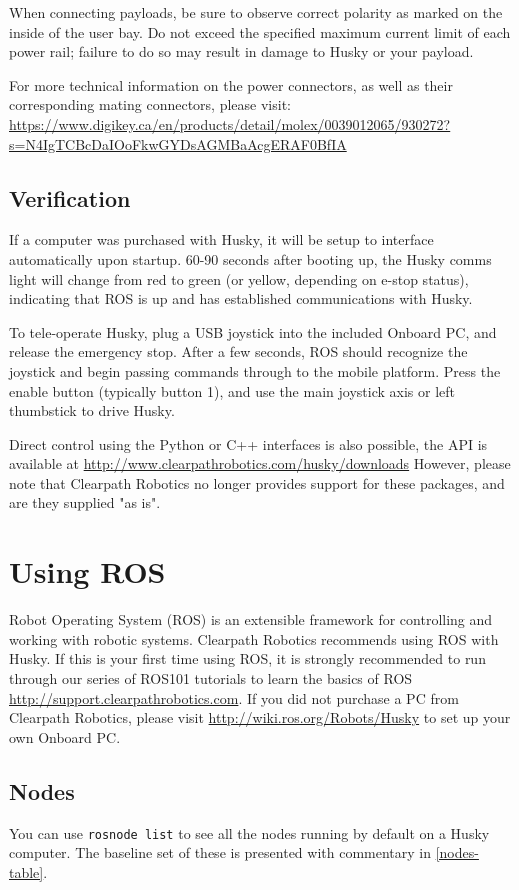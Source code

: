 \documentclass[]{clearpath-latex/clearpath-manual}
\begin{document}
When connecting payloads, be sure to observe correct polarity as marked on the inside of the user bay.
Do not exceed the specified maximum current limit of each power rail; failure to do so may result in damage
to Husky or your payload.

For more technical information on the power connectors, as well as their corresponding mating connectors, please visit: \url{https://www.digikey.ca/en/products/detail/molex/0039012065/930272?s=N4IgTCBcDaIOoFkwGYDsAGMBaAcgERAF0BfIA}

\subsection{Verification}
If a computer was purchased with Husky, it will be setup to interface automatically upon startup.
60-90 seconds after booting up, the Husky comms light will change from red to green
(or yellow, depending on e-stop status), indicating that ROS is up and has established communications with Husky.

To tele-operate Husky, plug a USB joystick into the included Onboard PC, and release the emergency stop.
After a few seconds, ROS should recognize the joystick and begin passing commands through to the mobile platform.
Press the enable button (typically button 1), and use the main joystick axis or left thumbstick to drive Husky.

Direct control using the Python or C++ interfaces is also possible, the API is available at
\url{http://www.clearpathrobotics.com/husky/downloads} However, please note that Clearpath Robotics no
longer provides support for these packages, and are they supplied "as is".

\section{Using ROS}
Robot Operating System (ROS) is an extensible framework for controlling and working with robotic systems.
Clearpath Robotics recommends using ROS with Husky. If this is your first time using ROS, it is strongly
recommended to run through our series of ROS101 tutorials to learn the basics of ROS
\url{http://support.clearpathrobotics.com}. If you did not purchase a PC from Clearpath Robotics, please visit \url{http://wiki.ros.org/Robots/Husky}
to set up your own Onboard PC.

\subsection{Nodes}
You can use \lstinline{rosnode list} to see all the nodes running by default on a Husky computer.
The baseline set of these is presented with commentary in \autoref{nodes-table}.
\end{document}
